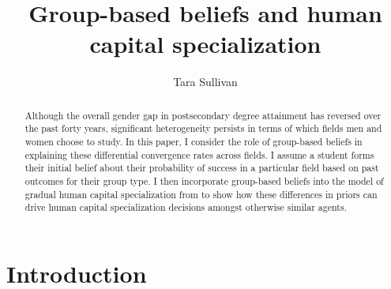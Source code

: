 \documentclass[11 pt]{article}
\newcommand{\toedit}[1]{{\color{gray}#1}}
\newcommand{\toedit}[1]{#1}
\begin{document}

\title{Group-based beliefs and human capital specialization}
\author{Tara Sullivan%
}

\maketitle
\onehalfspacing


\begin{abstract}
Although the overall gender gap in postsecondary degree attainment has reversed over the past forty years, significant heterogeneity persists in terms of which fields men and women choose to study.
In this paper, I consider the role of group-based beliefs in explaining these differential convergence rates across fields. 
I assume a student forms their initial belief about their probability of success in a particular field based on past outcomes for their group type. 
I then incorporate group-based beliefs into the model of gradual human capital specialization from \textcite{AF20} to show how these differences in priors can drive human capital specialization decisions amongst otherwise similar agents. 


 

\end{abstract}

\section{Introduction}
\end{document}
